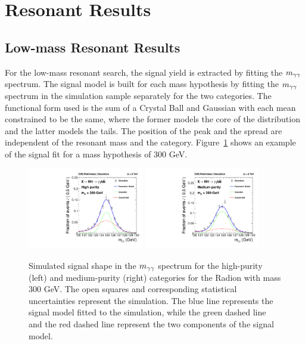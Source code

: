\section{Resonant Results\label{sec:resresults}}

\subsection{Low-mass Resonant Results}

For the low-mass resonant search, the signal yield is extracted by fitting the $m_{\gamma\gamma}$ spectrum.
The signal model is built for each mass hypothesis by fitting the $m_{\gamma\gamma}$ spectrum
in the simulation sample
separately for the two categories. The functional form used is the sum of a Crystal Ball and
Gaussian with each mean constrained to be the same,
where the former models the core of the distribution and the latter models the
tails. The position of the peak and the spread are independent of the resonant mass and the
category. Figure~\ref{fig:sigfit_300} shows an example of the signal fit for a mass hypothesis of
300 GeV.

\begin{figure}[ht!]
 \begin{center}
   \includegraphics[width=0.45\textwidth]{figures/results/sigmodel_cat0_300.pdf}
   \includegraphics[width=0.45\textwidth]{figures/results/sigmodel_cat1_300.pdf}
 \end{center}
\caption{Simulated signal shape in the $m_{\gamma\gamma}$ spectrum for the high-purity (left) and medium-purity
(right) categories for the Radion with mass 300 GeV. The open squares and corresponding
statistical uncertainties represent the simulation.
The blue line represents the signal model fitted to the simulation, while the green dashed line
and the red dashed line represent the two components of the signal model.}
\label{fig:sigfit_300}
\end{figure}

